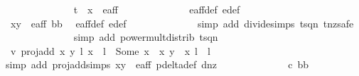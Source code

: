 \begin{isabellebody}
\ \ \ \ \ \ \ \ \ \ \isamarkupfalse%
\ {\isachardoublequoteopen}{\isacharparenleft}{}\ {\isacharslash}\ {\isacharparenleft}t\ {\isacharasterisk}\ x{\isacharprime}{\isacharparenright}{\isacharcomma}{}{\isacharparenright}\ {\isasymnotin}\ e{\isacharunderscore}aff{\isachardoublequoteclose}\isanewline
\ \ \ \ \ \ \ \ \ \ \ \ \isamarkupfalse%
\ e{\isacharunderscore}aff{\isacharunderscore}def\ e{\isacharprime}{\isacharunderscore}def\ \isanewline
\ \ \ \ \ \ \ \ \ \ \ \ \isamarkupfalse%
\ {\isacartoucheopen}{\isacharparenleft}x{\isacharprime}{\isacharcomma}y{\isacharprime}{\isacharparenright}\ {\isasymin}\ e{\isacharunderscore}aff{\isacartoucheclose}\ bb\ \isamarkupfalse%
\ e{\isacharunderscore}aff{\isacharunderscore}def\ e{\isacharprime}{\isacharunderscore}def\ \isanewline
\ \ \ \ \ \ \ \ \ \ \ \ \isamarkupfalse%
{\isacharparenleft}simp\ add{\isacharcolon}\ divide{\isacharunderscore}simps\ t{\isacharunderscore}sq{\isacharunderscore}n{}\ t{\isacharunderscore}nz{\isacharcomma}safe{\isacharparenright}\isanewline
\ \ \ \ \ \ \ \ \ \ \ \ \isamarkupfalse%
\ {\isacharparenleft}simp\ add{\isacharcolon}\ power{\isacharunderscore}mult{\isacharunderscore}distrib\ t{\isacharunderscore}sq{\isacharunderscore}n{}{\isacharparenright}\isanewline
\ \ \ \ \ \ \ \ \ \ \isamarkupfalse%
\ v{}{\isacharcolon}\ {\isachardoublequoteopen}proj{\isacharunderscore}add\ {\isacharparenleft}{\isacharparenleft}x{\isacharcomma}\ y{\isacharparenright}{\isacharcomma}\ l{\isacharparenright}\ {\isacharparenleft}{\isacharparenleft}x{\isacharprime}{\isacharcomma}\ {}{\isacharparenright}{\isacharcomma}\ l{\isacharprime}{\isacharparenright}\ {\isacharequal}\ Some\ {\isacharparenleft}{\isacharparenleft}x\ {\isacharasterisk}\ x{\isacharprime}{\isacharcomma}\ y\ {\isacharasterisk}\ x{\isacharprime}{\isacharparenright}{\isacharcomma}\ l\ {\isacharplus}\ l{\isacharprime}{\isacharparenright}{\isachardoublequoteclose}\isanewline
\ \ \ \ \ \ \ \ \ \ \ \ \isamarkupfalse%
{\isacharparenleft}simp\ add{\isacharcolon}\ proj{\isacharunderscore}add{\isachardot}simps\ {\isacartoucheopen}{\isacharparenleft}x{\isacharcomma}y{\isacharparenright}\ {\isasymin}\ e{\isacharunderscore}aff{\isacartoucheclose}\ p{\isacharunderscore}delta{\isacharunderscore}def\ d{\isacharunderscore}{}{\isacharunderscore}nz{\isacharparenright}\isanewline
\ \ \ \ \ \ \ \ \ \ \ \ \isamarkupfalse%
\ c\ bb\ \isamarkupfalse%

\end{isabellebody}
